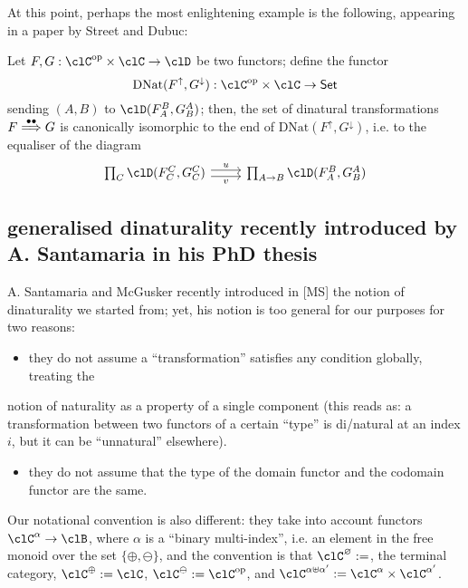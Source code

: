 \documentclass[11pt]{amsart}
\begin{document}
At this point, perhaps the most enlightening example is the following, appearing in a paper by Street and Dubuc: 

\begin{proposition}
Let $F,G : \clC^\text{op} \times \clC \to \clD$ be two functors; define the functor 
\[
\mathrm{DNat}(F^\uparrow,G^\downarrow) : \clC^\text{op} \times \clC \to \mathsf{Set}
\] sending $(A,B)$ to $\clD(F_A^B, G^A_B)$; then, the set of dinatural transformations $F \overset{\bullet\bullet}\Longrightarrow G$ is canonically isomorphic to the end of $\text{DNat}(F^\uparrow,G^\downarrow)$, i.e. to the equaliser of the diagram  
\[
\begin{tikzcd}
	\prod_C \clD(F_C^C,G_C^C) \ar[r,shift left, "u"] \ar[r,shift right, "v"'] & \prod_{A\to B} \clD(F_A^B, G_B^A)
\end{tikzcd}	
\]
\end{proposition}

\subsection{generalised dinaturality recently introduced by A. Santamaria in his PhD thesis}
\label{sec:orgc27d079}

A. Santamaria and McGusker recently introduced in [MS] the notion of dinaturality we started from; 
yet, his notion is too general for our purposes for two reasons:

\begin{itemize}
\item they do not assume a ``transformation'' satisfies any condition globally, treating the
\end{itemize}
notion of naturality as a property of a single component (this reads as: a transformation between two functors of a certain ``type'' is di/natural at an index \(i\), but it can be ``unnatural'' elsewhere). 
\begin{itemize}
\item they do not assume that the type of the domain functor and the codomain functor are the same.
\end{itemize}

Our notational convention is also different: they take into account functors \(\clC^\alpha \to \clB\), where \(\alpha\) is a ``binary multi-index'', i.e. an element in the free monoid over the set \(\{\oplus,\ominus\}\), and the convention is that \(\clC^\varnothing := \*\), the terminal category, \(\clC^\oplus := \clC\), \(\clC^\ominus := \clC^\op\), and \(\clC^{\alpha \uplus \alpha'} := \clC^\alpha \times \clC^{\alpha'}\).
\end{document}
